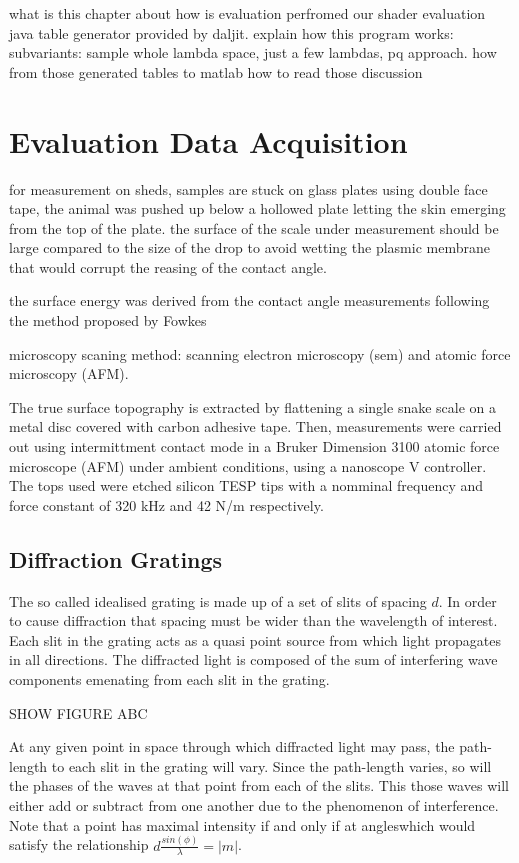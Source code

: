 what is this chapter about
how is evaluation perfromed
our shader
evaluation java table generator provided by daljit.
explain how this program works:
subvariants: sample whole lambda space, just a few lambdas, pq approach.
how from those generated tables to matlab
how to read those
discussion


\section{Evaluation Data Acquisition}

for measurement on sheds, samples are stuck on glass plates using double face tape, the animal was pushed up below a hollowed plate letting the skin emerging from the top of the plate. the surface of the scale under measurement should be large compared to the size of the drop to avoid wetting the plasmic membrane that would corrupt the reasing of the contact angle. 

the surface energy was derived from the contact angle measurements following the method proposed by Fowkes

microscopy
scaning method: scanning electron microscopy (sem) and atomic force microscopy (AFM).

The true surface topography is extracted by flattening a single snake scale on a metal disc covered with carbon adhesive tape. Then, measurements were carried out using intermittment contact mode in a Bruker Dimension 3100 atomic force microscope (AFM) under ambient conditions, using a nanoscope V controller. The tops used were etched silicon TESP tips with a nomminal frequency and force constant of 320 kHz and 42 N/m respectively. 


\subsection{Diffraction Gratings}

The so called idealised grating is made up of a set of slits of spacing $d$. In order to cause diffraction that spacing must be wider than the wavelength of interest. Each slit in the grating acts as a quasi point source from which light propagates in all directions. The diffracted light is composed of the sum of interfering wave components emenating from each slit in the grating. 

SHOW FIGURE ABC

At any given point in space through which diffracted light may pass, the path-length to each slit in the grating will vary. Since the path-length varies, so will the phases of the waves at that point from each of the slits. This those waves will either add or subtract from one another due to the phenomenon of interference. Note that a point has maximal intensity if and only if at angleswhich would satisfy the relationship $d \frac{sin(\phi)}{\lambda} = |m|$. 

